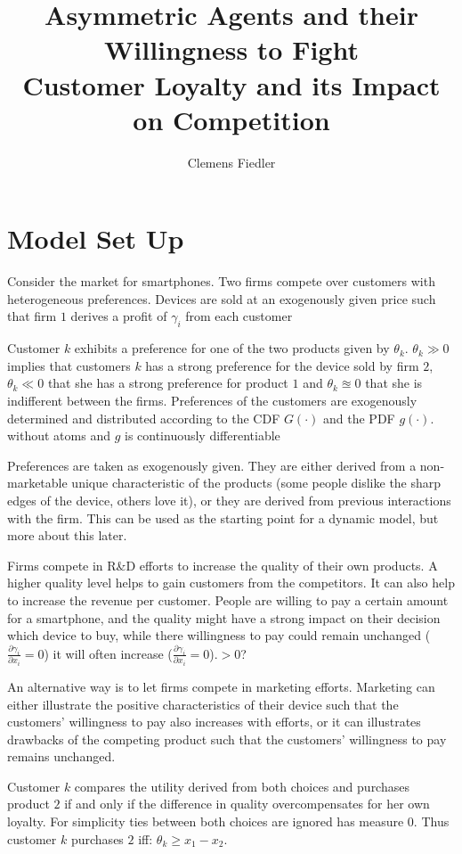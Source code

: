 \documentclass[a4paper, 11pt]{article}
\author{Clemens Fiedler}
\title{Asymmetric Agents and their Willingness to Fight\\
	Customer Loyalty and its Impact on Competition}
\begin{document}
	
\maketitle

\section{Model Set Up}
Consider the market for smartphones. Two firms compete over customers with heterogeneous preferences. Devices are sold at an exogenously given price such that firm $1$ derives a profit of $\gamma_i$ from each customer
 
Customer $k$ exhibits a preference for one of the two products given by $\theta_k$. $\theta_k\gg0$ implies that customers $k$ has a strong preference for the device sold by firm $2$, $\theta_k\ll0$ that she has a strong preference for product $1$ and $\theta_k\approxeq 0$ that she is indifferent between the firms. Preferences of the customers are exogenously determined and distributed according to the CDF $G(\cdot)$ and the PDF $g(\cdot)$. without atoms and $g$ is continuously differentiable

Preferences are taken as exogenously given. They are either derived from a non-marketable unique characteristic of the products (some people dislike the sharp edges of the device, others love it), or they are derived from previous interactions with the firm. This can be used as the starting point for a dynamic model, but more about this later.

Firms compete in R\&D efforts to increase the quality of their own products. A higher quality level helps to gain customers from the competitors. It can also help to increase the revenue per customer. People are willing to pay a certain amount for a smartphone, and the quality might have a strong impact on their decision which device to buy, while there willingness to pay could remain unchanged ($\frac{\partial \gamma_i}{\partial x_i}=0$) it will often increase ($\frac{\partial \gamma_i}{\partial x_i}=0$).$>0$?

An alternative way is to let firms compete in marketing efforts. Marketing can either illustrate the positive characteristics of their device such that the customers' willingness to pay also increases with efforts, or it can illustrates drawbacks of the competing product such that the customers' willingness to pay remains unchanged.

Customer $k$ compares the utility derived from both choices and purchases product $2$ if and only if the difference in quality overcompensates for her own loyalty. For simplicity ties between both choices are ignored has measure 0. Thus customer $k$ purchases $2$ iff:
$\theta_k\geq x_1-x_2$.
\end{document}
